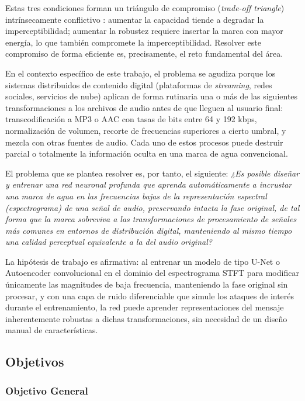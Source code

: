 Estas tres condiciones forman un triángulo de compromiso (\textit{trade-off triangle}) intrínsecamente conflictivo \cite{cox2007digital}: aumentar la capacidad tiende a degradar la imperceptibilidad; aumentar la robustez requiere insertar la marca con mayor energía, lo que también compromete la imperceptibilidad. Resolver este compromiso de forma eficiente es, precisamente, el reto fundamental del área.

En el contexto específico de este trabajo, el problema se agudiza porque los sistemas distribuidos de contenido digital (plataformas de \textit{streaming}, redes sociales, servicios de nube) aplican de forma rutinaria una o más de las siguientes transformaciones a los archivos de audio antes de que lleguen al usuario final: transcodificación a MP3 o AAC con tasas de bits entre 64 y 192 kbps, normalización de volumen, recorte de frecuencias superiores a cierto umbral, y mezcla con otras fuentes de audio. Cada uno de estos procesos puede destruir parcial o totalmente la información oculta en una marca de agua convencional.

El problema que se plantea resolver es, por tanto, el siguiente: \textit{¿Es posible diseñar y entrenar una red neuronal profunda que aprenda automáticamente a incrustar una marca de agua en las frecuencias bajas de la representación espectral (espectrograma) de una señal de audio, preservando intacta la fase original, de tal forma que la marca sobreviva a las transformaciones de procesamiento de señales más comunes en entornos de distribución digital, manteniendo al mismo tiempo una calidad perceptual equivalente a la del audio original?}

La hipótesis de trabajo es afirmativa: al entrenar un modelo de tipo U-Net o Autoencoder convolucional en el dominio del espectrograma STFT para modificar únicamente las magnitudes de baja frecuencia, manteniendo la fase original sin procesar, y con una capa de ruido diferenciable que simule los ataques de interés durante el entrenamiento, la red puede aprender representaciones del mensaje inherentemente robustas a dichas transformaciones, sin necesidad de un diseño manual de características.

\subsection{Objetivos}
\label{sec:objetivos}

\subsubsection{Objetivo General}
\label{subsec:objective_general}

